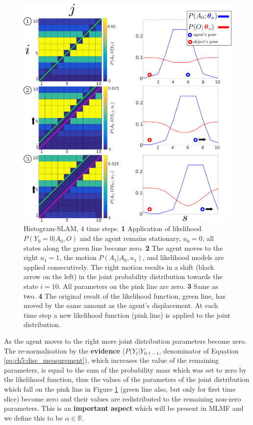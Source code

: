 \begin{figure}
 \centering
  \includegraphics[width=\textwidth]{./ch5-MLMF/Figures/explenation/hist_motion.pdf}
  \caption{Histogram-SLAM, 4 time steps. \textbf{1} Application of likelihood $P(Y_0=0|A_0,O)$ and the agent remains stationary, $u_0=0$, all states along the green line become zero.
  \textbf{2} The agent moves to the right $u_1=1$, the motion $P(A_1|A_0,u_1)$, and likelihood models are applied consecutively. The right motion results in a shift (black arrow on the left) in the joint probability 
  distribution towards the state $i=10$. All parameters on the pink line are zero. \textbf{3} Same as two. \textbf{4} The original result of the likelihood function,
  green line, has moved by the same amount as the agent's displacement. At each time step a new likelihood function (pink line) is applied to the joint distribution.}
  \label{fig:discrete_example}
\end{figure}

As the agent moves to the right more joint distribution parameters become zero. The re-normalisation by the \textbf{evidence} ($P(Y_t|Y_{0:t-1}$, denominator of Equation \ref{eq:ch5:disc_measurement}), 
which increases the value of the remaining parameters, is equal to the sum of the probability mass which was set to zero by the likelihood function,
thus the values of the parameters of the joint distribution which fall on the pink line in Figure \ref{fig:discrete_example} 
(green line also, but only for first time slice) become zero and their values are redistributed to the remaining non-zero parameters. 
This is an \textbf{important aspect} which will be present in MLMF and we define this to be $\alpha \in \mathbb{R}$.

